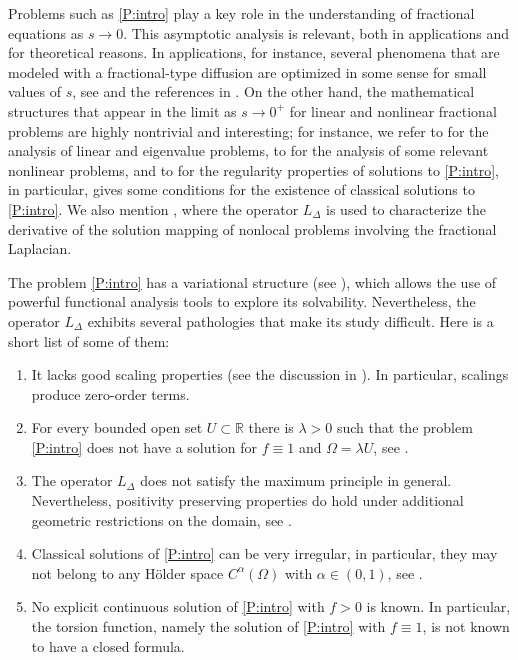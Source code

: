 \documentclass[10 pt]{article}
\numberwithin{equation}{section}
\def\R{\mathbb{R}}
\begin{document}
 Problems such as \eqref{P:intro} play a key role in the understanding of fractional equations as $s\to 0$. This asymptotic analysis is relevant, both in applications and for theoretical reasons.  In applications, for instance, several phenomena that are modeled with a fractional-type diffusion are optimized in some sense for small values of $s$, see \cite{Caffarelli17} and the references in \cite{HSS22}.  On the other hand,  the mathematical structures that appear in the limit as $s\to 0^+$ for linear and nonlinear fractional problems are highly nontrivial and interesting; for instance, we refer to \cite{CW19,LW21,FJW22} for the analysis of linear and eigenvalue problems, to \cite{AS22,HSS22} for the analysis of some relevant nonlinear problems, and to \cite{CS22} for the regularity properties of solutions to \eqref{P:intro}, in particular, \cite[Theorem 1.1]{CS22} gives some conditions for the existence of classical solutions to \eqref{P:intro}.  We also mention \cite{JSW20}, where the operator $L_\Delta$ is used to characterize the derivative of the solution mapping of nonlocal problems involving the fractional Laplacian.

The problem \eqref{P:intro} has a variational structure (see \cite{CW19}), which allows the use of powerful functional analysis tools to explore its solvability. Nevertheless, the operator $L_\Delta$ exhibits several pathologies that make its study difficult. Here is a short list of some of them:
\begin{enumerate}
    \item It lacks good scaling properties (see the discussion in \cite{CS22}).  In particular, scalings produce zero-order terms. 
    \item For every bounded open set $U\subset \R$ there is $\lambda>0$ such that the problem \eqref{P:intro} does not have a solution for $f\equiv 1$ and $\Omega=\lambda U$, see \cite[Remark 5.9]{CS22}.
    \item The operator $L_\Delta$ does not satisfy the maximum principle in general. Nevertheless, positivity preserving properties do hold under additional geometric restrictions on the domain, see \cite[Theorem 1.8 and Corollary 1.9]{CW19}.
    \item Classical solutions of \eqref{P:intro} can be very irregular, in particular, they may not belong to any Hölder space $C^\alpha(\Omega)$ with $\alpha\in(0,1)$, see \cite[Remark 5.6]{CS22}.
    \item No explicit continuous solution of \eqref{P:intro} with $f>0$ is known. In particular, the torsion function, namely the solution of \eqref{P:intro} with $f\equiv 1$, is not known to have a closed formula.
\end{enumerate}
\end{document}
